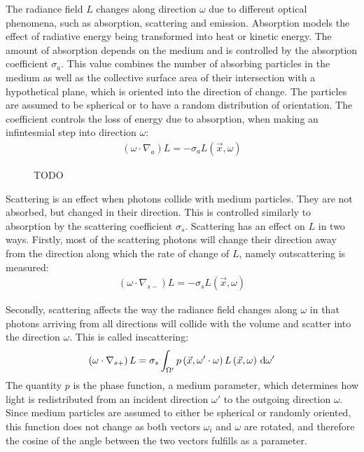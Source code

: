 The radiance field $L$ changes along direction $\omega$ due to different optical phenomena, such as absorption, scattering and emission. Absorption models the effect of radiative energy being transformed into heat or kinetic energy. The amount of absorption depends on the medium and is controlled by the absorption coefficient $\sigma_a$. This value combines the number of absorbing particles in the medium as well as the collective surface area of their intersection with a hypothetical plane, which is oriented into the direction of change. The particles are assumed to be spherical or to have a random distribution of orientation. The coefficient controls the loss of energy due to absorption, when making an infintesmial step into direction $\omega$:
\begin{align}
\left(\omega\cdot\nabla_{a}\right)L = -\sigma_a L\left(\vec{x}, \omega \right)
\end{align}

\begin{figure}[t]
\centering
{}
\caption{TODO}
\label{fig:rte_change_L_all}
\end{figure}


Scattering is an effect when photons collide with medium particles. They are not absorbed, but changed in their direction. This is controlled similarly to absorption by the scattering coefficient $\sigma_s$. Scattering has an effect on $L$ in two ways. Firstly, most of the scattering photons will change their direction away from the direction along which the rate of change of $L$, namely outscattering is measured:
\begin{align}
\left(\omega\cdot\nabla_{s-}\right)L = -\sigma_s L\left(\vec{x}, \omega \right)
\end{align}

Secondly, scattering affects the way the radiance field changes along $\omega$ in that photons arriving from all directions will collide with the volume and scatter into the direction $\omega$. This is called inscattering:
\begin{align}
\left(\omega\cdot\nabla_{s+}\right)L = \sigma_s \int_{\Omega'}p\left(\vec{x}, \omega'\cdot\omega\right)L\left(\vec{x}, \omega \right)\,\mathrm{d}\omega'
\label{eq:rte_inscattering}
\end{align}
The quantity $p$ is the phase function, a medium parameter, which determines how light is redistributed from an incident direction $\omega'$ to the outgoing direction $\omega$. Since medium particles are assumed to either be spherical or randomly oriented, this function does not change as both vectors $\omega_i$ and $\omega$ are rotated, and therefore the cosine of the angle between the two vectors fulfills as a parameter.

